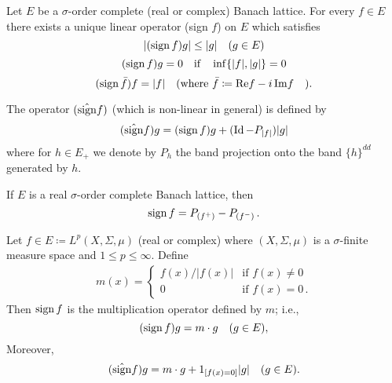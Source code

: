 \begin{proposition}\label{prop:c2-2.1}
Let $E$ be a $\sigma$-order complete (real or complex) Banach lattice.
For every $f \in E$ there exists a unique linear operator (sign $f$) on $E$ which satisfies
\begin{equation}\label{eq:c2-2.1}
|(\operatorname{sign} f)g| \leq |g| \quad (g \in E)
\end{equation}
\begin{equation}\label{eq:c2-2.2}
(\operatorname{sign} f)g = 0 \quad \text{if} \quad \inf\{|f|,|g|\} = 0
\end{equation}
\begin{equation}\label{eq:c2-2.3}
(\operatorname{sign} \bar{f})f = |f| \quad \text{(where } \bar{f} \coloneqq \mathop{}\!\mathrm{Re} f - i\mathop{}\!\mathrm{Im} f  \quad \text{)}.
\end{equation}
\end{proposition}
The operator $(\hat{\operatorname{sign}} f)$ (which is non-linear in general) is defined by
\begin{equation}\label{eq:c2-2.4}
(\hat{\operatorname{sign}}f)g = (\operatorname{sign} f)g + (\operatorname{Id} - P_{|f|})|g|
\end{equation}
where for $h \in E_{+}$ we denote by $P_h$ the band projection onto the band $\{h\}^{dd}$ generated by $h$.

If $E$ is a real $\sigma$-order complete Banach lattice, then
\begin{equation}\label{eq:c2-2.5}
\operatorname{sign} f = P_{(f^{+})} - P_{(f^{-})} \,.
\end{equation}

\begin{example}\label{ex:c2-2.2}
Let $f \in E \coloneqq L^p(X,\Sigma,\mu)$ (real or complex) where $(X,\Sigma,\mu)$ is a $\sigma$-finite measure space and $1 \leq p \leq \infty$.
Define
\begin{align*}
m(x) = 
\begin{cases}
    f(x)/|f(x)| & \text{if } f(x) \neq 0 \\
    0 & \text{if } f(x) = 0 \,.
\end{cases}
\end{align*}
Then $\operatorname{sign} f$ is the multiplication operator defined by $m$; i.e.,
\[
(\operatorname{sign} f)g = m \cdot g \quad (g \in E), 
\]
Moreover, 
\[
(\hat{\operatorname{sign}} f)g = m \cdot g + 1_{[f(x)=0]}|g| \quad (g \in E).
\]
\end{example}

